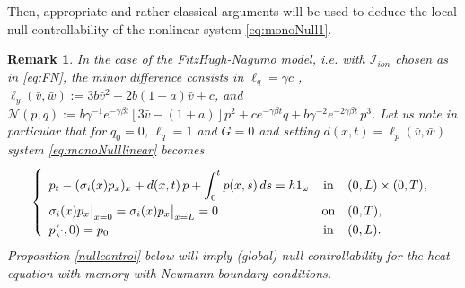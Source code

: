 \documentclass[10pt]{article}
\newtheorem{rmq}{Remark}
\def\dis{\displaystyle}
\def\\Phivec{\mathbf{\Phi}}
\def \blue {\color{blue}}
\def \red {\color{red}}
\begin{document}
    Then, appropriate and rather classical arguments will be used to deduce the local null controllability of the nonlinear
    system \eqref{eq:monoNull1}.
     \begin{rmq}\label{rem1.1}
	In the case of the FitzHugh-Nagumo model, i.e. with $\mathcal{I}_{ion}$ chosen as in \eqref{eq:FN}, the minor difference
consists in $\ell_q =\gamma c$ , $\ell_y(\bar v,\bar w):=3b\bar
v^2-2b(1+a)\bar v+c$, and $\mathcal{N}(p,q):=b\gamma^{-1}e^{-\gamma\beta
t}[3\bar v-(1+a)] p^2+ce^{-\gamma\beta t}q
     + b\gamma^{-2}e^{-2\gamma\beta t}\,p^3$.\newline
    \noindent
    Let us note in particular that for $q_0=0$, $\ell_q=1$ and $G=0$ and setting $d(x,t)=\ell_p(\bar v, \bar w)$
system \eqref{eq:monoNulllinear} becomes
    \begin{equation}\label{eq:heatmemory}
     \left\{
         \begin{array}{lcl}
          \noalign{\smallskip}\dis
         p_t-(\sigma_i(x) p_x)_x + d(x,t)\,p + \int_0^t p(x,s)\, ds
          = h1_{\omega}         &  \mbox{in}&    (0,L) \times (0,T),      \\
             \noalign{\smallskip}\dis
             \sigma_i(x)p_x\big|_{x=0}=\sigma_i(x)p_x\big|_{x=L} = 0
        & \mbox{on}& (0,T),    \\
             \noalign{\smallskip}\dis
             p(\cdot,0) =p_0     & \mbox{in}&   (0,L).
         \end{array}
     \right.
\end{equation}
   Proposition \ref{nullcontrol} below will imply (global) null
controllability  for the heat equation with memory with Neumann boundary conditions.
   \end{rmq}
%
\end{document}
